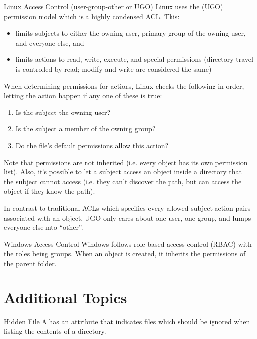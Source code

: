 \documentclass[code]{amznotes}
\begin{document}
\begin{exbox}{Linux Access Control (user-group-other or UGO)}{}
    Linux uses the  (UGO) permission model which is a highly condensed ACL. This:
    \begin{itemize}[noitemsep]
        \item limits subjects to either the owning user, primary group of the owning user, and everyone else, and
        \item limits actions to read, write, execute, and special permissions (directory travel is controlled by read; modify and write are considered the same)
    \end{itemize}
    When determining permissions for actions, Linux checks the following in order, letting the action happen if any one of these is true:
    \begin{enumerate}[noitemsep]
        \item Is the subject the owning user?
        \item Is the subject a member of the owning group?
        \item Do the file's default permissions allow this action?
    \end{enumerate}
    Note that permissions are not inherited (i.e. every object has its own permission list). Also, it's possible to let a subject access an object inside a directory that the subject cannot access (i.e. they can't discover the path, but can access the object if they know the path).

    In contrast to traditional ACLs which specifies every allowed subject action pairs associated with an object, UGO only cares about one user, one group, and lumps everyone else into ``other''.
\end{exbox}

\begin{exbox}{Windows Access Control}{}
    Windows follows role-based access control (RBAC) with the roles being groups. When an object is created, it inherits the permissions of the parent folder.
\end{exbox}

\section{Additional Topics}

\begin{dfnbox}{Hidden File}{}
    A  has an attribute that indicates files which should be ignored when listing the contents of a directory.
\end{dfnbox}
\end{document}
